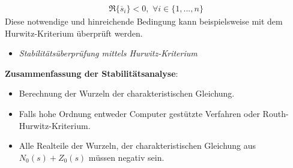 %
\begin{equation*}
\begin{aligned}
%
\Re\{\overline{s}_{i}\}<0, \,\, \forall i \in \{1,...,n\}
%
\end{aligned}
\end{equation*}
%
Diese notwendige und hinreichende Bedingung kann beispielsweise mit dem Hurwitz-Kriterium überprüft werden.
%
\begin{Aufgaben}{}{}
	\begin{itemize}
		\item \textit{Stabilitätsüberprüfung mittels Hurwitz-Kriterium}
	\end{itemize}
\end{Aufgaben}
%
\textbf{Zusammenfassung der Stabilitätsanalyse}:
\begin{itemize}
	\item Berechnung der Wurzeln der charakteristischen Gleichung.
	\item Falls hohe Ordnung entweder Computer gestützte Verfahren oder Routh-Hurwitz-Kriterium.
	\item Alle Realteile der Wurzeln, der charakteristischen Gleichung aus $N_{0}(s)+Z_{0}(s)$ müssen negativ sein.
\end{itemize} 
%
